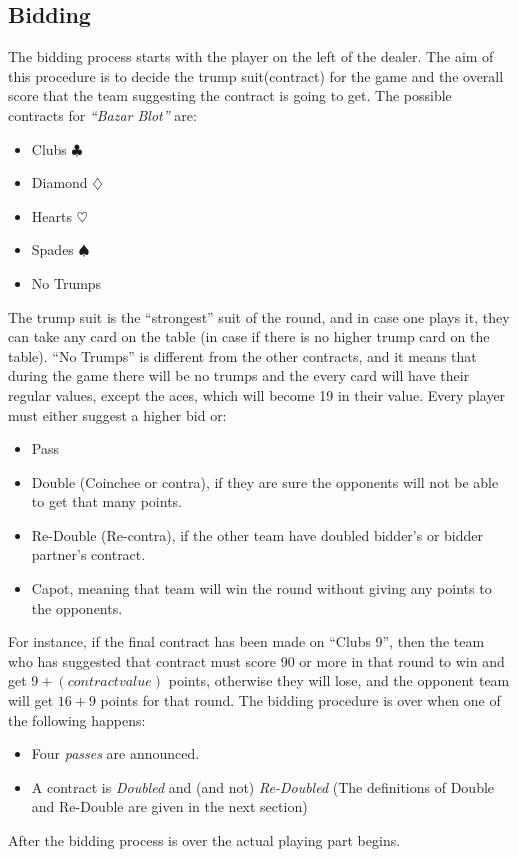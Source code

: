 \subsection{Bidding}
The bidding process starts with the player on the left of the dealer.
The aim of this procedure is to decide the trump suit(contract) for the game and the overall score that the team suggesting the contract is going to get.
The possible contracts for \textit{``Bazar Blot''} are:
\begin{itemize}
    \item Clubs $\clubsuit$
    \item Diamond $\diamondsuit$
    \item Hearts $\heartsuit$
    \item Spades $\spadesuit$
    \item No Trumps
\end{itemize}
The trump suit is the ``strongest'' suit of the round, and in case one plays it, they can take any card on the table (in case if there is no higher trump card on the table).
``No Trumps'' is different from the other contracts, and it means that during the game there will be no trumps and the every card will have their regular values, except the aces, which will become 19 in their value.
Every player must either suggest a higher bid or:
\begin{itemize}
    \item Pass
    \item Double (Coinchee or contra), if they are sure the opponents will not be able to get that many points.
    \item Re-Double (Re-contra), if the other team have doubled bidder's or bidder partner's contract.
    \item Capot, meaning that team will win the round without giving any points to the opponents.
\end{itemize}
For instance, if the final contract has been made on ``Clubs 9'', then the team who has suggested that contract must score 90 or more in that round to win and get $9+(contract value)$ points, otherwise they will lose, and the opponent team will get $16+9$ points for that round.
The bidding procedure is over when one of the following happens:
\begin{itemize}
    \item Four \textit{passes} are announced.
    \item A contract is \textit{Doubled} and (and not) \textit{Re-Doubled} (The definitions of Double and Re-Double are given in the next section)
\end{itemize}
After the bidding process is over the actual playing part begins.


